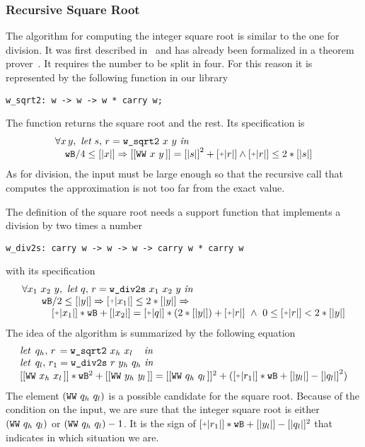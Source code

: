 \subsubsection{Recursive Square Root}

The algorithm for computing the integer square root is similar to the one for division.
It was first described in~\cite{RecSqrt} and has already been formalized in a 
theorem prover~\cite{BerMagZim02}. It requires the number to be split
in four. For this reason it is represented by the following function in our
library
\begin{verbatim}
w_sqrt2: w -> w -> w * carry w;
\end{verbatim}
The function returns the square root and the rest.
Its specification is
$$\begin{array}{l}
\forall x\, y,\,\, \textit{let}\,\, s,\, r = \texttt{w\_sqrt2}\,\, x\,\, y\,\, \textit{in}\\
\hskip10pt \wB / 4 \le [|x|] \Rightarrow [[\WW x y]] = {[|s|]} ^ 2 + \ICP{r} \land \ICP{r} \le 2 * [|s|]
\end{array}
$$
As for division, the input must be large enough so that the recursive call
that computes the approximation is not too far from the exact value. 

The definition of the square root needs a support function that implements a division
by two times a number
\begin{verbatim}
w_div2s: carry w -> w -> w -> carry w * carry w
\end{verbatim}
with its specification
$$\begin{array}{l}
\forall x_1\,\, x_2\,\, y, \,\, \textit{let}\,\, q,\, r = \texttt{w\_div2s}\,\, x_1\,\, x_2\,\, y\,\, \textit{in}\\
\hskip20pt \wB / 2 \le [|y|] \Rightarrow \ICP{x_1} \le 2 * [|y|] \Rightarrow\\
\hskip30pt \ICP{x_1} * \wB + [|x_2|] = \ICP{q} *  (2 * [|y|]) + \ICP{r} \,\, \land\,\, 0 \le \ICP{r} < 2 * [|y|]
\end{array}
$$
The idea of the algorithm is summarized by the following equation
$$\begin{array}{l}
\textit{let}\,\,\, {q_h} ,\, r\, = \texttt{w\_sqrt2}\,\, {x_h}\,\, {x_l}\quad\, \textit{in}\\
\textit{let}\,\,\, {q_l} ,\, r_1 = \texttt{w\_div2s}\,\, r\,\, {y_h}\,\, {q_h}\,\, \textit{in}\\
{[[\WW {x_h} {x_l}]]} * \wB ^ 2 + [[\WW {y_h} {y_l}]] =
    [[\WW {q_h} {q_l}]] ^ 2 + (\ICP{r_1} * \wB + [|{y_l}|] - {[|q_l|]} ^ 2) \\
\end{array}
$$
The element $(\texttt{WW}\,\,q_h\,\,q_l\,\!)$ is a possible candidate
for the square root. Because of the condition on
the input, we are sure that the integer square root is either 
$(\texttt{WW}\,\,q_h\,\,q_l\,\!)$ or
$(\texttt{WW}\,\,q_h\,\,q_l\,\!) - 1$. It is the sign of $\ICP{r_1} * \wB + 
[|{y_l}|] - [|q_l|] ^ 2$ that indicates in which situation we are. 

